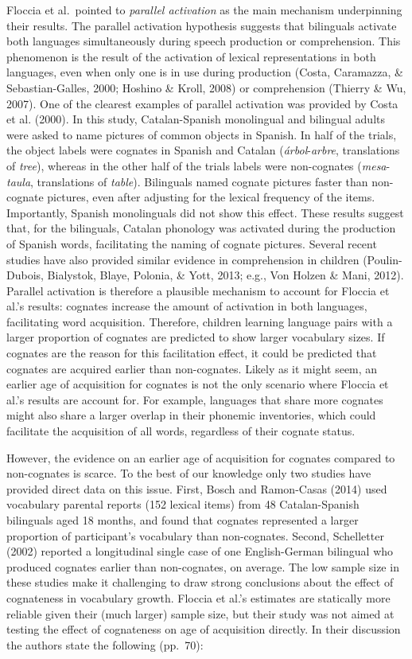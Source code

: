 \documentclass[
  english,
  man,man,floatsintext]{apa6}
\begin{document}
Floccia et al.~pointed to \emph{parallel activation} as the main mechanism underpinning their results. The parallel activation hypothesis suggests that bilinguals activate both languages simultaneously during speech production or comprehension. This phenomenon is the result of the activation of lexical representations in both languages, even when only one is in use during production (Costa, Caramazza, \& Sebastian-Galles, 2000; Hoshino \& Kroll, 2008) or comprehension (Thierry \& Wu, 2007). One of the clearest examples of parallel activation was provided by Costa et al. (2000). In this study, Catalan-Spanish monolingual and bilingual adults were asked to name pictures of common objects in Spanish. In half of the trials, the object labels were cognates in Spanish and Catalan (\emph{árbol}-\emph{arbre}, translations of \emph{tree}), whereas in the other half of the trials labels were non-cognates (\emph{mesa}-\emph{taula}, translations of \emph{table}). Bilinguals named cognate pictures faster than non-cognate pictures, even after adjusting for the lexical frequency of the items. Importantly, Spanish monolinguals did not show this effect. These results suggest that, for the bilinguals, Catalan phonology was activated during the production of Spanish words, facilitating the naming of cognate pictures. Several recent studies have also provided similar evidence in comprehension in children (Poulin-Dubois, Bialystok, Blaye, Polonia, \& Yott, 2013; e.g., Von Holzen \& Mani, 2012). Parallel activation is therefore a plausible mechanism to account for Floccia et al.'s results: cognates increase the amount of activation in both languages, facilitating word acquisition. Therefore, children learning language pairs with a larger proportion of cognates are predicted to show larger vocabulary sizes. If cognates are the reason for this facilitation effect, it could be predicted that cognates are acquired earlier than non-cognates. Likely as it might seem, an earlier age of acquisition for cognates is not the only scenario where Floccia et al.'s results are account for.
For example, languages that share more cognates might also share a larger overlap in their phonemic inventories, which could facilitate the acquisition of all words, regardless of their cognate status.

However, the evidence on an earlier age of acquisition for cognates compared to non-cognates is scarce. To the best of our knowledge only two studies have provided direct data on this issue. First, Bosch and Ramon-Casas (2014) used vocabulary parental reports (152 lexical items) from 48 Catalan-Spanish bilinguals aged 18 months, and found that cognates represented a larger proportion of participant's vocabulary than non-cognates. Second, Schelletter (2002) reported a longitudinal single case of one English-German bilingual who produced cognates earlier than non-cognates, on average. The low sample size in these studies make it challenging to draw strong conclusions about the effect of cognateness in vocabulary growth. Floccia et al.'s estimates are statically more reliable given their (much larger) sample size, but their study was not aimed at testing the effect of cognateness on age of acquisition directly. In their discussion the authors state the following (pp.~70):
\end{document}
